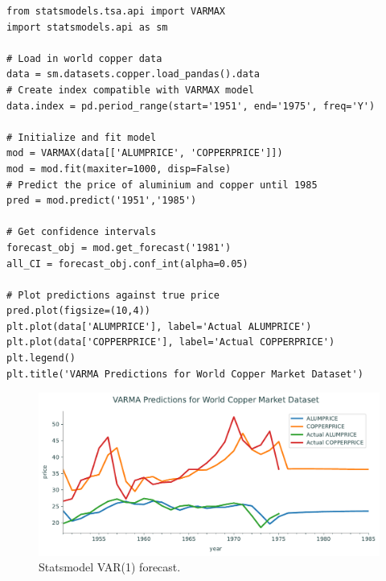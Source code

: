 \begin{lstlisting}
from statsmodels.tsa.api import VARMAX
import statsmodels.api as sm

# Load in world copper data
data = sm.datasets.copper.load_pandas().data
# Create index compatible with VARMAX model
data.index = pd.period_range(start='1951', end='1975', freq='Y')

# Initialize and fit model
mod = VARMAX(data[['ALUMPRICE', 'COPPERPRICE']])
mod = mod.fit(maxiter=1000, disp=False)
# Predict the price of aluminium and copper until 1985
pred = mod.predict('1951','1985')

# Get confidence intervals
forecast_obj = mod.get_forecast('1981')
all_CI = forecast_obj.conf_int(alpha=0.05)

# Plot predictions against true price
pred.plot(figsize=(10,4))
plt.plot(data['ALUMPRICE'], label='Actual ALUMPRICE')
plt.plot(data['COPPERPRICE'], label='Actual COPPERPRICE')
plt.legend()
plt.title('VARMA Predictions for World Copper Market Dataset')
\end{lstlisting}

\begin{figure}[H]
\centering
\includegraphics[width=\textwidth]{figures/copper.pdf}
\caption{Statsmodel VAR(1) forecast.}
\label{fig:varma}
\end{figure}

